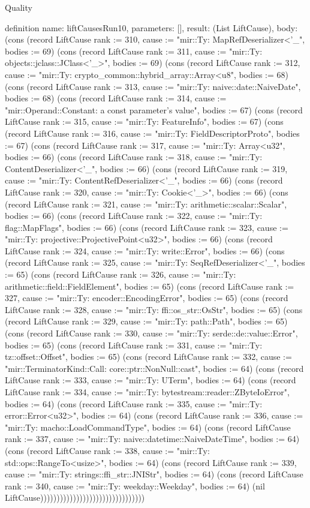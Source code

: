 \begin{lexlean}{Quality}
\begin{semanticmodule}
definition{
  name: liftCausesRun10,
  parameters: [],
  result: (List LiftCause),
  body: (cons (record LiftCause {rank := 310, cause := "mir::Ty: MapRefDeserializer<'_", bodies := 69}) (cons (record LiftCause {rank := 311, cause := "mir::Ty: objects::jclass::JClass<'_>", bodies := 69}) (cons (record LiftCause {rank := 312, cause := "mir::Ty: crypto_common::hybrid_array::Array<u8", bodies := 68}) (cons (record LiftCause {rank := 313, cause := "mir::Ty: naive::date::NaiveDate", bodies := 68}) (cons (record LiftCause {rank := 314, cause := "mir::Operand::Constant: a const parameter's value", bodies := 67}) (cons (record LiftCause {rank := 315, cause := "mir::Ty: FeatureInfo", bodies := 67}) (cons (record LiftCause {rank := 316, cause := "mir::Ty: FieldDescriptorProto", bodies := 67}) (cons (record LiftCause {rank := 317, cause := "mir::Ty: Array<u32", bodies := 66}) (cons (record LiftCause {rank := 318, cause := "mir::Ty: ContentDeserializer<'_", bodies := 66}) (cons (record LiftCause {rank := 319, cause := "mir::Ty: ContentRefDeserializer<'_", bodies := 66}) (cons (record LiftCause {rank := 320, cause := "mir::Ty: Cookie<'_>", bodies := 66}) (cons (record LiftCause {rank := 321, cause := "mir::Ty: arithmetic::scalar::Scalar", bodies := 66}) (cons (record LiftCause {rank := 322, cause := "mir::Ty: flag::MapFlags", bodies := 66}) (cons (record LiftCause {rank := 323, cause := "mir::Ty: projective::ProjectivePoint<u32>", bodies := 66}) (cons (record LiftCause {rank := 324, cause := "mir::Ty: write::Error", bodies := 66}) (cons (record LiftCause {rank := 325, cause := "mir::Ty: SeqRefDeserializer<'_", bodies := 65}) (cons (record LiftCause {rank := 326, cause := "mir::Ty: arithmetic::field::FieldElement", bodies := 65}) (cons (record LiftCause {rank := 327, cause := "mir::Ty: encoder::EncodingError", bodies := 65}) (cons (record LiftCause {rank := 328, cause := "mir::Ty: ffi::os_str::OsStr", bodies := 65}) (cons (record LiftCause {rank := 329, cause := "mir::Ty: path::Path", bodies := 65}) (cons (record LiftCause {rank := 330, cause := "mir::Ty: serde::de::value::Error", bodies := 65}) (cons (record LiftCause {rank := 331, cause := "mir::Ty: tz::offset::Offset", bodies := 65}) (cons (record LiftCause {rank := 332, cause := "mir::TerminatorKind::Call: core::ptr::NonNull::cast", bodies := 64}) (cons (record LiftCause {rank := 333, cause := "mir::Ty: UTerm", bodies := 64}) (cons (record LiftCause {rank := 334, cause := "mir::Ty: bytestream::reader::ZByteIoError", bodies := 64}) (cons (record LiftCause {rank := 335, cause := "mir::Ty: error::Error<u32>", bodies := 64}) (cons (record LiftCause {rank := 336, cause := "mir::Ty: macho::LoadCommandType", bodies := 64}) (cons (record LiftCause {rank := 337, cause := "mir::Ty: naive::datetime::NaiveDateTime", bodies := 64}) (cons (record LiftCause {rank := 338, cause := "mir::Ty: std::ops::RangeTo<usize>", bodies := 64}) (cons (record LiftCause {rank := 339, cause := "mir::Ty: strings::ffi_str::JNIStr", bodies := 64}) (cons (record LiftCause {rank := 340, cause := "mir::Ty: weekday::Weekday", bodies := 64}) (nil LiftCause))))))))))))))))))))))))))))))))
}


\end{semanticmodule}
\end{lexlean}
